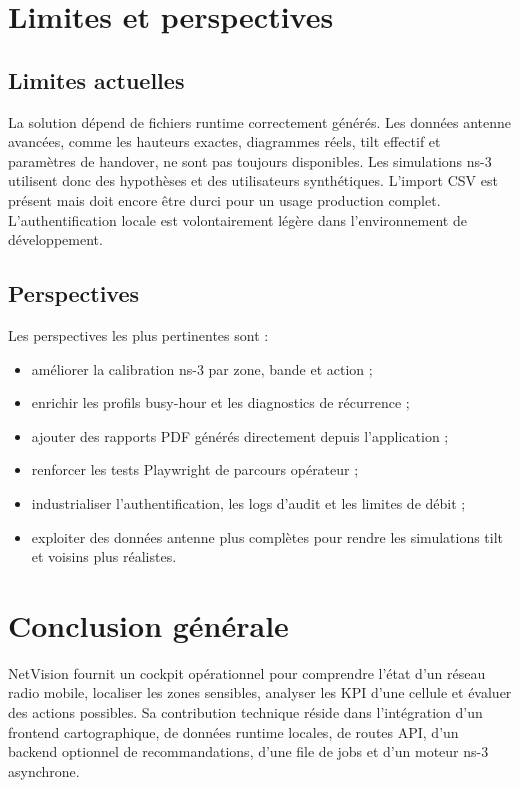 \documentclass[12pt,a4paper,oneside]{report}
\begin{document}
\chapter{Limites et perspectives}
\section{Limites actuelles}
La solution dépend de fichiers runtime correctement générés. Les données antenne avancées, comme les hauteurs exactes, diagrammes réels, tilt effectif et paramètres de handover, ne sont pas toujours disponibles. Les simulations ns-3 utilisent donc des hypothèses et des utilisateurs synthétiques. L'import CSV est présent mais doit encore être durci pour un usage production complet. L'authentification locale est volontairement légère dans l'environnement de développement.

\section{Perspectives}
Les perspectives les plus pertinentes sont :
\begin{itemize}
    \item améliorer la calibration ns-3 par zone, bande et action ;
    \item enrichir les profils busy-hour et les diagnostics de récurrence ;
    \item ajouter des rapports PDF générés directement depuis l'application ;
    \item renforcer les tests Playwright de parcours opérateur ;
    \item industrialiser l'authentification, les logs d'audit et les limites de débit ;
    \item exploiter des données antenne plus complètes pour rendre les simulations tilt et voisins plus réalistes.
\end{itemize}

\chapter{Conclusion générale}
NetVision fournit un cockpit opérationnel pour comprendre l'état d'un réseau radio mobile, localiser les zones sensibles, analyser les KPI d'une cellule et évaluer des actions possibles. Sa contribution technique réside dans l'intégration d'un frontend cartographique, de données runtime locales, de routes API, d'un backend optionnel de recommandations, d'une file de jobs et d'un moteur ns-3 asynchrone.
\end{document}
